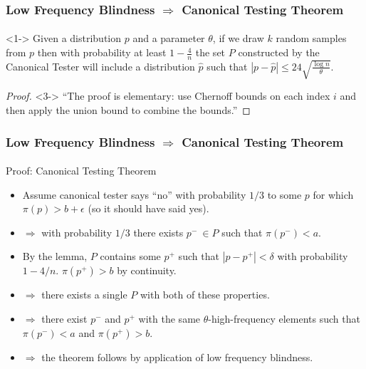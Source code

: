 \documentclass[handout]{beamer}
\begin{document}
\begin{frame}
  \frametitle{Low Frequency Blindness $\Rightarrow$ Canonical Testing
    Theorem} \framesubtitle{}
  \begin{lemma}<1->
    Given a distribution $p$ and a parameter $\theta$, if we draw $k$
    random samples from $p$ then with probability at least
    $1-\frac{4}{n}$ the set $P$ constructed by the Canonical Tester
    will include a distribution $\hat{p}$ such that $|p-\hat p
    |\le 24\sqrt{\frac{\log n}{\theta}}$.
  \end{lemma}
  \begin{proof}<3->
    ``The proof is elementary: use Chernoff bounds on each index $i$
    and then apply the union bound to combine the bounds.''
  \end{proof}
\end{frame}


\begin{frame}
  \frametitle{Low Frequency Blindness $\Rightarrow$ Canonical Testing
    Theorem} \framesubtitle{}

  
  \begin{block}{Proof: Canonical Testing Theorem}
    \begin{itemize}
    \item<2-> Assume canonical tester says ``no'' with probability $1/3$
      to some $p$ for which $\pi(p)>b+\epsilon$ (so it should have
      said yes).
    \item<3-> $\Rightarrow$ with probability $1/3$ there exists $p^-\ \in
      P$ such that $\pi(p^-)<a$.
    \item<4-> By the lemma, $P$ contains some $p^+$ such that
      $|p-p^+|<\delta$ with probability $1-4/n$. $\pi(p^+)>b$ by continuity.
    \item<5-> $\Rightarrow$ there exists a single $P$ with both of these
      properties.
    \item<6-> $\Rightarrow$ there exist $p^-$ and $p^+$ with the same
      $\theta$-high-frequency elements such that $\pi(p^-)<a$ and $\pi(p^+)>b$.
    \item<7-> $\Rightarrow$ the theorem follows by application of low
      frequency blindness.
    \end{itemize}
  \end{block}
\end{frame}
\end{document}
